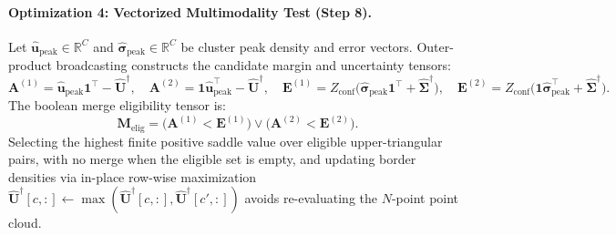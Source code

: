 \paragraph{Optimization 4: Vectorized Multimodality Test (Step 8).}
Let $\hat{\mathbf{u}}_{\mathrm{peak}} \in \mathbb{R}^C$ and
$\hat{\bm{\sigma}}_{\mathrm{peak}} \in \mathbb{R}^C$ be
cluster peak density and error vectors. Outer-product broadcasting
constructs the candidate margin and uncertainty tensors:
\begin{equation}
  \mathbf{A}^{(1)} = \hat{\mathbf{u}}_{\mathrm{peak}}
  \mathbf{1}^\top - \hat{\mathbf{U}}^\dagger, \quad
  \mathbf{A}^{(2)} = \mathbf{1}
  \hat{\mathbf{u}}_{\mathrm{peak}}^\top - \hat{\mathbf{U}}^\dagger, \quad
  \mathbf{E}^{(1)} =
  Z_{\mathrm{conf}}\bigl(\hat{\bm{\sigma}}_{\mathrm{peak}}
  \mathbf{1}^\top + \hat{\mathbf{\Sigma}}^\dagger\bigr), \quad
  \mathbf{E}^{(2)} =
  Z_{\mathrm{conf}}\bigl(\mathbf{1}\hat{\bm{\sigma}}_{\mathrm{peak}}^\top
  + \hat{\mathbf{\Sigma}}^\dagger\bigr).
  \label{eq:outer_product_merging}
\end{equation}
The boolean merge eligibility tensor is:
\begin{equation}
  \mathbf{M}_{\mathrm{elig}} = \bigl(\mathbf{A}^{(1)} <
  \mathbf{E}^{(1)}\bigr) \lor \bigl(\mathbf{A}^{(2)} < \mathbf{E}^{(2)}\bigr).
  \label{eq:merge_eligibility}
\end{equation}
Selecting the highest finite positive saddle value over eligible
upper-triangular pairs, with no merge when the eligible set is empty, and
updating border densities via in-place row-wise maximization
$\hat{\mathbf{U}}^\dagger[c, :] \leftarrow
\max(\hat{\mathbf{U}}^\dagger[c, :], \hat{\mathbf{U}}^\dagger[c',
:])$ avoids re-evaluating the $N$-point point cloud.
